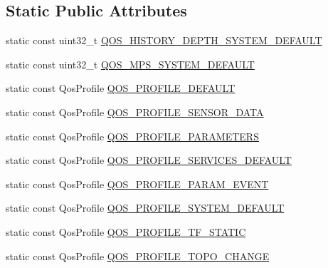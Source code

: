 \subsection*{Static Public Attributes}
\begin{DoxyCompactItemize}
\item 
static const uint32\-\_\-t \hyperlink{classapollo_1_1cyber_1_1transport_1_1QosProfileConf_a01b3adefbb67d7c0333e5365943c9c8a}{Q\-O\-S\-\_\-\-H\-I\-S\-T\-O\-R\-Y\-\_\-\-D\-E\-P\-T\-H\-\_\-\-S\-Y\-S\-T\-E\-M\-\_\-\-D\-E\-F\-A\-U\-L\-T}
\item 
static const uint32\-\_\-t \hyperlink{classapollo_1_1cyber_1_1transport_1_1QosProfileConf_ac9ff5eb3609410ef99c7d19c5b7439c9}{Q\-O\-S\-\_\-\-M\-P\-S\-\_\-\-S\-Y\-S\-T\-E\-M\-\_\-\-D\-E\-F\-A\-U\-L\-T}
\item 
static const Qos\-Profile \hyperlink{classapollo_1_1cyber_1_1transport_1_1QosProfileConf_af1854c8e098bf7f13e18521fb24ec552}{Q\-O\-S\-\_\-\-P\-R\-O\-F\-I\-L\-E\-\_\-\-D\-E\-F\-A\-U\-L\-T}
\item 
static const Qos\-Profile \hyperlink{classapollo_1_1cyber_1_1transport_1_1QosProfileConf_abd2423568cef1781288f373e1c760b61}{Q\-O\-S\-\_\-\-P\-R\-O\-F\-I\-L\-E\-\_\-\-S\-E\-N\-S\-O\-R\-\_\-\-D\-A\-T\-A}
\item 
static const Qos\-Profile \hyperlink{classapollo_1_1cyber_1_1transport_1_1QosProfileConf_af72edb0c15d155e6525a5f1d73b4f1de}{Q\-O\-S\-\_\-\-P\-R\-O\-F\-I\-L\-E\-\_\-\-P\-A\-R\-A\-M\-E\-T\-E\-R\-S}
\item 
static const Qos\-Profile \hyperlink{classapollo_1_1cyber_1_1transport_1_1QosProfileConf_a22c47d504186ffd0b333c61b0c714e03}{Q\-O\-S\-\_\-\-P\-R\-O\-F\-I\-L\-E\-\_\-\-S\-E\-R\-V\-I\-C\-E\-S\-\_\-\-D\-E\-F\-A\-U\-L\-T}
\item 
static const Qos\-Profile \hyperlink{classapollo_1_1cyber_1_1transport_1_1QosProfileConf_ac49a990430d519ca3c796941cc223d1a}{Q\-O\-S\-\_\-\-P\-R\-O\-F\-I\-L\-E\-\_\-\-P\-A\-R\-A\-M\-\_\-\-E\-V\-E\-N\-T}
\item 
static const Qos\-Profile \hyperlink{classapollo_1_1cyber_1_1transport_1_1QosProfileConf_adc7f08325616096491838b9870acbb2d}{Q\-O\-S\-\_\-\-P\-R\-O\-F\-I\-L\-E\-\_\-\-S\-Y\-S\-T\-E\-M\-\_\-\-D\-E\-F\-A\-U\-L\-T}
\item 
static const Qos\-Profile \hyperlink{classapollo_1_1cyber_1_1transport_1_1QosProfileConf_a39081029045b86c779419dcc552d56b2}{Q\-O\-S\-\_\-\-P\-R\-O\-F\-I\-L\-E\-\_\-\-T\-F\-\_\-\-S\-T\-A\-T\-I\-C}
\item 
static const Qos\-Profile \hyperlink{classapollo_1_1cyber_1_1transport_1_1QosProfileConf_af529ca3a1cd90caf0075c799f9a99437}{Q\-O\-S\-\_\-\-P\-R\-O\-F\-I\-L\-E\-\_\-\-T\-O\-P\-O\-\_\-\-C\-H\-A\-N\-G\-E}
\end{DoxyCompactItemize}


